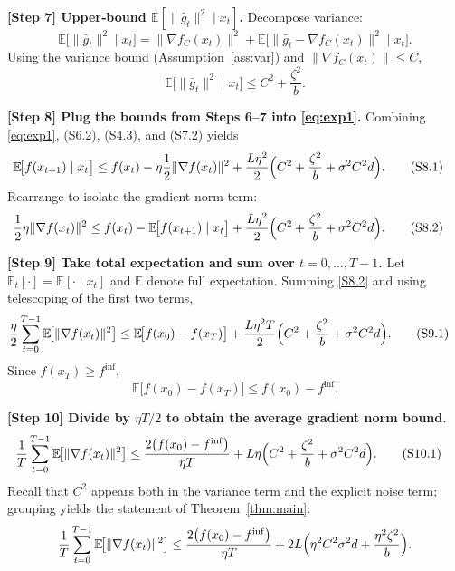 \documentclass{article}
\newcommand{\EE}{\mathbb{E}}
\newcommand{\grad}{\nabla}
\begin{document}
\noindent\textbf{[Step 7] Upper‑bound $\EE[\|\bar g_{t}\|^{2}\mid x_{t}]$.}  
Decompose variance:
\[
\EE\!\bigl[\|\bar g_{t}\|^{2}\mid x_{t}\bigr] 
= \|\grad f_{C}(x_{t})\|^{2} + \EE\!\bigl[\|\bar g_{t}-\grad f_{C}(x_{t})\|^{2}\mid x_{t}\bigr]. \tag{S7.1}
\]
Using the variance bound (Assumption~\ref{ass:var}) and $\|\grad f_{C}(x_{t})\|\le C$,
\[
\EE\!\bigl[\|\bar g_{t}\|^{2}\mid x_{t}\bigr] \le C^{2} + \frac{\zeta^{2}}{b}. \tag{S7.2}
\]

\noindent\textbf{[Step 8] Plug the bounds from Steps 6–7 into \eqref{eq:exp1}.}  
Combining \eqref{eq:exp1}, (S6.2), (S4.3), and (S7.2) yields
\begin{align}
\EE\!\bigl[f(x_{t+1})\mid x_{t}\bigr] 
&\le f(x_{t}) - \eta\frac{1}{2}\|\grad f(x_{t})\|^{2}
   +\frac{L\eta^{2}}{2}\Bigl(C^{2}+ \frac{\zeta^{2}}{b}+ \sigma^{2}C^{2}d\Bigr). \tag{S8.1}
\end{align}
Rearrange to isolate the gradient norm term:
\begin{align}
\frac{1}{2}\eta\|\grad f(x_{t})\|^{2}
&\le f(x_{t})- \EE\!\bigl[f(x_{t+1})\mid x_{t}\bigr]
   +\frac{L\eta^{2}}{2}\Bigl(C^{2}+ \frac{\zeta^{2}}{b}+ \sigma^{2}C^{2}d\Bigr). \tag{S8.2}
\end{align}

\noindent\textbf{[Step 9] Take total expectation and sum over $t=0,\dots,T-1$.}  
Let $\EE_{t}[\cdot]=\EE[\cdot\mid x_{t}]$ and $\EE$ denote full expectation.
Summing \eqref{S8.2} and using telescoping of the first two terms,
\begin{align}
\frac{\eta}{2}\sum_{t=0}^{T-1}\EE\!\bigl[\|\grad f(x_{t})\|^{2}\bigr]
&\le \EE\!\bigl[f(x_{0})-f(x_{T})\bigr]
   +\frac{L\eta^{2}T}{2}\Bigl(C^{2}+ \frac{\zeta^{2}}{b}+ \sigma^{2}C^{2}d\Bigr). \tag{S9.1}
\end{align}
Since $f(x_{T})\ge f^{\inf}$,
\[
\EE\!\bigl[f(x_{0})-f(x_{T})\bigr]\le f(x_{0})-f^{\inf}. \tag{S9.2}
\]

\noindent\textbf{[Step 10] Divide by $\eta T/2$ to obtain the average gradient norm bound.}
\begin{align}
\frac{1}{T}\sum_{t=0}^{T-1}\EE\!\bigl[\|\grad f(x_{t})\|^{2}\bigr]
&\le \frac{2\bigl(f(x_{0})-f^{\inf}\bigr)}{\eta T}
   + L\eta\Bigl(C^{2}+ \frac{\zeta^{2}}{b}+ \sigma^{2}C^{2}d\Bigr). \tag{S10.1}
\end{align}
Recall that $C^{2}$ appears both in the variance term and the explicit noise term; grouping yields the statement of Theorem~\ref{thm:main}:
\[
\frac{1}{T}\sum_{t=0}^{T-1}\EE\!\bigl[\|\grad f(x_{t})\|^{2}\bigr]
\le \frac{2\bigl(f(x_{0})-f^{\inf}\bigr)}{\eta T}
   + 2L\Bigl(\eta^{2}C^{2}\sigma^{2}d + \frac{\eta^{2}\zeta^{2}}{b}\Bigr).
\]
\end{document}
